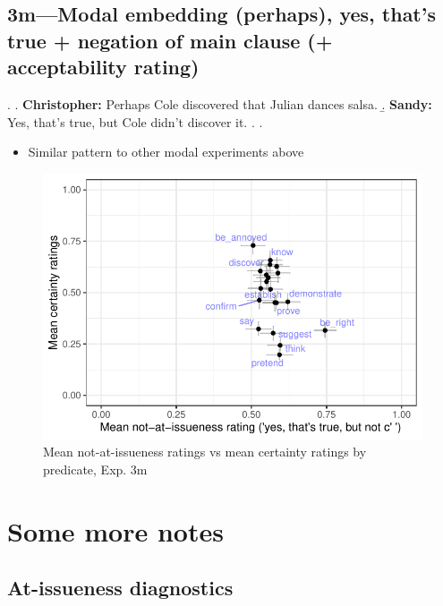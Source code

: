 \documentclass[11pt]{article}
\begin{document}

	\pagebreak
	\subsection{3m---Modal embedding (perhaps), yes, that's true + negation of main clause (+ acceptability rating)} %
		\ex. \a. \textbf{Christopher:} Perhaps Cole discovered that Julian dances salsa.
			\b. \textbf{Sandy:} Yes, that’s true, but Cole didn't discover it.
			\z.
		\z.

		\begin{itemize}
			\item Similar pattern to other modal experiments above
		\end{itemize}

		\begin{figure}[h]
			\centering
			\includegraphics[]{figures/m3-correl.pdf}
			\caption{Mean not-at-issueness ratings vs mean certainty ratings by predicate, Exp. 3m}
			\label{fig:m3-corr}
		\end{figure}
	
	
\pagebreak
\section{Some more notes} %
	
	\subsection{At-issueness diagnostics} %
		
\end{document}
